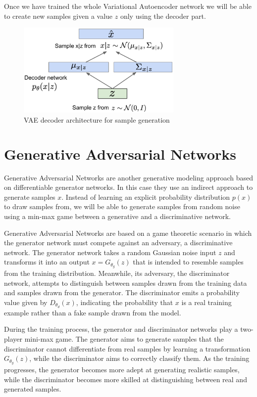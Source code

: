 \newpage
\noindent Once we have trained the whole Variational Autoencoder network we will be able to create new samples given a value $z$ only using the decoder part.

\begin{figure}
    \centering
    \includegraphics[width=8cm]{Images/decoder-vae.png}
    \caption{VAE decoder architecture for sample generation}
\end{figure}



\newpage
\section{Generative Adversarial Networks}

Generative Adversarial Networks are another generative modeling approach based on differentiable generator networks. In this case they use an indirect approach to generate samples $x$. Instead of learning an explicit probability distribution $p(x)$ to draw samples from, we will be able to generate samples from random noise using a min-max game between a generative and a discriminative network.

Generative Adversarial Networks are based on a game theoretic scenario in which the generator network must compete against an adversary, a discriminative network. The generator network takes a random Gaussian noise input $z$ and transforms it into an output $x=G_{\theta_g} (z)$ that is intended to resemble samples from the training distribution. Meanwhile, its adversary, the discriminator network, attempts to distinguish between samples drawn from the training data and samples drawn from the generator. The discriminator emits a probability value given by $D_{\theta_d} (x)$, indicating the probability that $x$ is a real training example rather than a fake sample drawn from the model.

During the training process, the generator and discriminator networks play a two-player mini-max game. The generator aims to generate samples that the discriminator cannot differentiate from real samples by learning a transformation $G_{\theta_g} (z)$, while the discriminator aims to correctly classify them. As the training progresses, the generator becomes more adept at generating realistic samples, while the discriminator becomes more skilled at distinguishing between real and generated samples.


